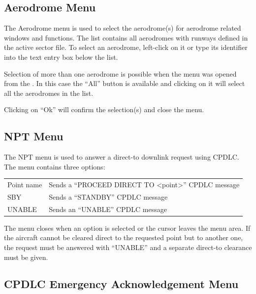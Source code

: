 \documentclass[a4paper,oneside,11pt]{memoir}
\begin{document}
\subsection{Aerodrome Menu}
\label{menu:ad}

The Aerodrome menu is used to select the aerodrome(s) for aerodrome related windows and functions. The list contains all aerodromes with runways defined in the active sector file. To select an aerodrome, left-click on it or type its identifier into the text entry box below the list.

\bigskip

Selection of more than one aerodrome is possible when the menu was opened from the . In this case the “All” button is available and clicking on it will select all the aerodromes in the list.

\bigskip

Clicking on “Ok” will confirm the selection(s) and close the menu.

\subsection{NPT Menu}
\label{menu:npt}

The NPT menu is used to answer a direct-to downlink request using CPDLC. The menu
contains three options:

\bigskip

\begin{longtable}{p{5cm} p{7.5cm}}
Point name  & Sends a “PROCEED DIRECT TO <point>” CPDLC message\\
SBY         & Sends a “STANDBY” CPDLC message\\
UNABLE      & Sends an “UNABLE” CPDLC message\\   
\end{longtable}

\bigskip

The menu closes when an option is selected or the cursor leaves the menu area. If the aircraft cannot be cleared direct to the requested point but to another one, the request must be answered with “UNABLE” and a separate direct-to clearance must be given.


\subsection{CPDLC Emergency Acknowledgement Menu}
\label{menu:dleam}
\end{document}
